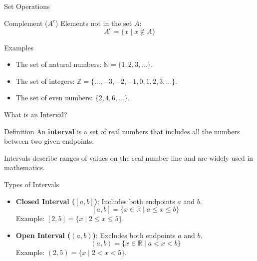 \documentclass{beamer}
\begin{document}
\begin{frame}{Set Operations}
  \begin{block}{Complement (\(A^c\))}
    Elements not in the set \(A\):
    \[
    A^c = \{x \mid x \notin A\}
    \]
\end{block}

  \begin{block}{Examples}
      \begin{itemize}
          \item The set of natural numbers: \(\mathbb{N} = \{1, 2, 3, \dots\}\).
          \item The set of integers: \(\mathbb{Z} = \{\dots, -3, -2, -1, 0, 1, 2, 3, \dots\}\).
          \item The set of even numbers: \(\{2, 4, 6, \dots\}\).
      \end{itemize}
  \end{block}
\end{frame} 



\begin{frame}{What is an Interval?}
  \begin{block}{Definition}
      An \textbf{interval} is a set of real numbers that includes all the numbers between two given endpoints.
  \end{block}
  \vspace{10pt}
  Intervals describe ranges of values on the real number line and are widely used in mathematics.
\end{frame}

\begin{frame}{Types of Intervals}
  \begin{itemize}
      \item \textbf{Closed Interval (\([a, b]\))}: Includes both endpoints \(a\) and \(b\).
      \[
      [a, b] = \{x \in \mathbb{R} \mid a \leq x \leq b\}
      \]
      Example: \([2, 5] = \{x \mid 2 \leq x \leq 5\}\).
      \vspace{5pt}

      \item \textbf{Open Interval (\((a, b)\))}: Excludes both endpoints \(a\) and \(b\).
      \[
      (a, b) = \{x \in \mathbb{R} \mid a < x < b\}
      \]
      Example: \((2, 5) = \{x \mid 2 < x < 5\}\).
  \end{itemize}
\end{frame}
\end{document}
